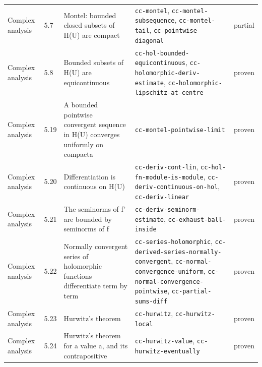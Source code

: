\begin{longtable}{@{}ll>{\raggedright\arraybackslash}p{4.2cm}>{\raggedright\arraybackslash}p{4.2cm}l@{}}
Complex analysis & 5.7 & Montel: bounded closed subsets of H(U) are compact & \texttt{cc-\allowbreak{}montel}, \texttt{cc-\allowbreak{}montel-\allowbreak{}subsequence}, \texttt{cc-\allowbreak{}montel-\allowbreak{}tail}, \texttt{cc-\allowbreak{}pointwise-\allowbreak{}diagonal} & partial \\
Complex analysis & 5.8 & Bounded subsets of H(U) are equicontinuous & \texttt{cc-\allowbreak{}hol-\allowbreak{}bounded-\allowbreak{}equicontinuous}, \texttt{cc-\allowbreak{}holomorphic-\allowbreak{}deriv-\allowbreak{}estimate}, \texttt{cc-\allowbreak{}holomorphic-\allowbreak{}lipschitz-\allowbreak{}at-\allowbreak{}centre} & proven \\
Complex analysis & 5.19 & A bounded pointwise convergent sequence in H(U) converges uniformly on compacta & \texttt{cc-\allowbreak{}montel-\allowbreak{}pointwise-\allowbreak{}limit} & proven \\
Complex analysis & 5.20 & Differentiation is continuous on H(U) & \texttt{cc-\allowbreak{}deriv-\allowbreak{}cont-\allowbreak{}lin}, \texttt{cc-\allowbreak{}hol-\allowbreak{}fn-\allowbreak{}module-\allowbreak{}is-\allowbreak{}module}, \texttt{cc-\allowbreak{}deriv-\allowbreak{}continuous-\allowbreak{}on-\allowbreak{}hol}, \texttt{cc-\allowbreak{}deriv-\allowbreak{}linear} & proven \\
Complex analysis & 5.21 & The seminorms of f' are bounded by seminorms of f & \texttt{cc-\allowbreak{}deriv-\allowbreak{}seminorm-\allowbreak{}estimate}, \texttt{cc-\allowbreak{}exhaust-\allowbreak{}ball-\allowbreak{}inside} & proven \\
Complex analysis & 5.22 & Normally convergent series of holomorphic functions differentiate term by term & \texttt{cc-\allowbreak{}series-\allowbreak{}holomorphic}, \texttt{cc-\allowbreak{}derived-\allowbreak{}series-\allowbreak{}normally-\allowbreak{}convergent}, \texttt{cc-\allowbreak{}normal-\allowbreak{}convergence-\allowbreak{}uniform}, \texttt{cc-\allowbreak{}normal-\allowbreak{}convergence-\allowbreak{}pointwise}, \texttt{cc-\allowbreak{}partial-\allowbreak{}sums-\allowbreak{}diff} & proven \\
Complex analysis & 5.23 & Hurwitz's theorem & \texttt{cc-\allowbreak{}hurwitz}, \texttt{cc-\allowbreak{}hurwitz-\allowbreak{}local} & proven \\
Complex analysis & 5.24 & Hurwitz's theorem for a value a, and its contrapositive & \texttt{cc-\allowbreak{}hurwitz-\allowbreak{}value}, \texttt{cc-\allowbreak{}hurwitz-\allowbreak{}eventually} & proven \\

\end{longtable}
